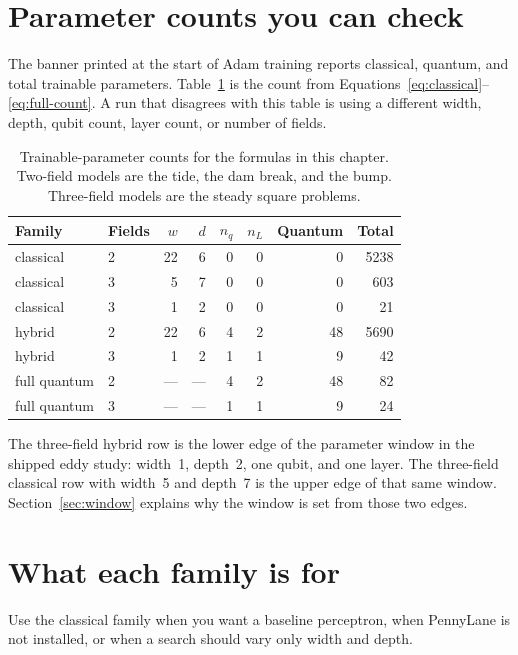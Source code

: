 \section{Parameter counts you can check}
\label{sec:counts}

The banner printed at the start of Adam training reports classical, quantum, and total trainable parameters.
Table~\ref{tab:counts} is the count from Equations~\eqref{eq:classical}--\eqref{eq:full-count}.
A run that disagrees with this table is using a different width, depth, qubit count, layer count, or number of fields.

\begin{table}[ht]
\centering
\caption{Trainable-parameter counts for the formulas in this chapter.
Two-field models are the tide, the dam break, and the bump.
Three-field models are the steady square problems.}
\label{tab:counts}
\begin{tabular}{@{}llrrrrrr@{}}
\toprule
Family & Fields & \(w\) & \(d\) & \(n_{q}\) & \(n_{L}\) & Quantum & Total \\
\midrule
classical & 2 & 22 & 6 & 0 & 0 & 0 & 5238 \\
classical & 3 & 5 & 7 & 0 & 0 & 0 & 603 \\
classical & 3 & 1 & 2 & 0 & 0 & 0 & 21 \\
hybrid & 2 & 22 & 6 & 4 & 2 & 48 & 5690 \\
hybrid & 3 & 1 & 2 & 1 & 1 & 9 & 42 \\
full quantum & 2 & --- & --- & 4 & 2 & 48 & 82 \\
full quantum & 3 & --- & --- & 1 & 1 & 9 & 24 \\
\bottomrule
\end{tabular}
\end{table}

The three-field hybrid row is the lower edge of the parameter window in the shipped eddy study: width~1, depth~2, one qubit, and one layer.
The three-field classical row with width~5 and depth~7 is the upper edge of that same window.
Section~\ref{sec:window} explains why the window is set from those two edges.

\section{What each family is for}

Use the classical family when you want a baseline perceptron, when PennyLane is not installed, or when a search should vary only width and depth.

